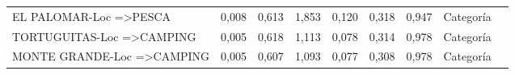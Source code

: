 \documentclass[]{article}
\begin{document}
\begin{landscape}
\begin{table}[h]
\begin{tabular}{lllllllll}
				EL PALOMAR-Loc =\textgreater PESCA                                                    & 0,008   & 0,613      & 1,853  & 0,120  & 0,318      & 0,947 & Categoría           &  \\
				TORTUGUITAS-Loc =\textgreater CAMPING                                                 & 0,005   & 0,618      & 1,113  & 0,078  & 0,314      & 0,978 & Categoría           &  \\
				MONTE GRANDE-Loc =\textgreater CAMPING                                                & 0,005   & 0,607      & 1,093  & 0,077  & 0,308      & 0,978 & Categoría           & 
			\end{tabular}
		\end{table}
	\end{landscape}
	\restoregeometry
	
	
	
\end{document}
